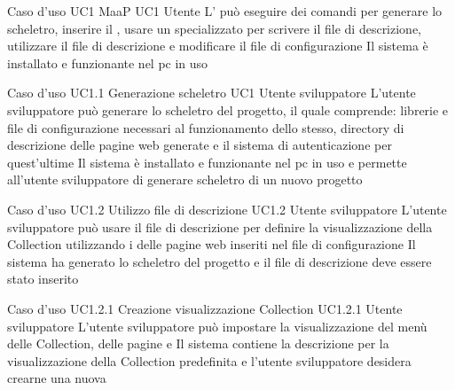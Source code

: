 \UCtitle
{Caso d'uso UC1}
{MaaP}
\UC
{UC1}
{Utente }
{L'  può eseguire dei comandi per generare lo scheletro, inserire il , usare un  specializzato per scrivere il file di descrizione, utilizzare il file di descrizione e modificare il file di configurazione}
{Il sistema è installato e funzionante nel pc in uso}

\UCtitle
{Caso d'uso UC1.1}
{Generazione scheletro}
\UC
{UC1}
{Utente sviluppatore}
{L'utente sviluppatore può generare lo scheletro del progetto, il quale comprende: librerie e file di configurazione necessari al funzionamento dello stesso, directory di descrizione delle pagine web generate e il sistema di autenticazione per quest'ultime}
{Il sistema è installato e funzionante nel pc in uso e permette all'utente sviluppatore di generare scheletro di un nuovo progetto}



\UCtitle
{Caso d'uso UC1.2}
{Utilizzo file di descrizione}
\UC
{UC1.2}
{Utente sviluppatore}
{L'utente sviluppatore  può usare il file di descrizione per definire la visualizzazione della Collection utilizzando i  delle pagine web inseriti nel file di configurazione}
{Il sistema ha generato lo scheletro del progetto e il file di descrizione deve essere stato inserito}

\UCtitle
{Caso d'uso UC1.2.1}
{Creazione visualizzazione Collection}
\UC
{UC1.2.1}
{Utente sviluppatore}
{L'utente sviluppatore  può impostare la visualizzazione del menù delle Collection, delle pagine  e }
{Il sistema contiene la descrizione per la visualizzazione della Collection predefinita e l'utente sviluppatore desidera crearne una nuova}

